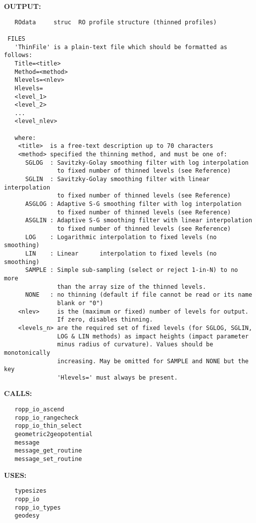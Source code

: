 \textbf{OUTPUT:}\hspace{0.08in}\begin{Verbatim}
   ROdata     struc  RO profile structure (thinned profiles)

 FILES
   'ThinFile' is a plain-text file which should be formatted as follows:
   Title=<title>
   Method=<method>
   Nlevels=<nlev>
   Hlevels=
   <level_1>
   <level_2>
   ...
   <level_nlev>

   where:
    <title>  is a free-text description up to 70 characters
    <method> specified the thinning method, and must be one of:
      SGLOG  : Savitzky-Golay smoothing filter with log interpolation
               to fixed number of thinned levels (see Reference)
      SGLIN  : Savitzky-Golay smoothing filter with linear interpolation
               to fixed number of thinned levels (see Reference)
      ASGLOG : Adaptive S-G smoothing filter with log interpolation
               to fixed number of thinned levels (see Reference)
      ASGLIN : Adaptive S-G smoothing filter with linear interpolation
               to fixed number of thinned levels (see Reference)
      LOG    : Logarithmic interpolation to fixed levels (no smoothing)
      LIN    : Linear      interpolation to fixed levels (no smoothing)
      SAMPLE : Simple sub-sampling (select or reject 1-in-N) to no more
               than the array size of the thinned levels.
      NONE   : no thinning (default if file cannot be read or its name
               blank or "0")
    <nlev>     is the (maximum or fixed) number of levels for output.
               If zero, disables thinning.
    <levels_n> are the required set of fixed levels (for SGLOG, SGLIN,
               LOG & LIN methods) as impact heights (impact parameter
               minus radius of curvature). Values should be monotonically
               increasing. May be omitted for SAMPLE and NONE but the key
               'Hlevels=' must always be present.
\end{Verbatim}
\textbf{CALLS:}\hspace{0.08in}\begin{Verbatim}
   ropp_io_ascend
   ropp_io_rangecheck
   ropp_io_thin_select
   geometric2geopotential
   message
   message_get_routine
   message_set_routine
\end{Verbatim}
\textbf{USES:}\hspace{0.08in}\begin{Verbatim}
   typesizes
   ropp_io
   ropp_io_types
   geodesy
\end{Verbatim}
